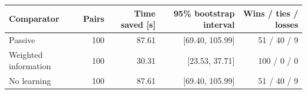 \begin{tabular}{lrrrr}
\toprule
Comparator & Pairs & Time saved [s] & 95\% bootstrap interval & Wins / ties / losses \\
\midrule
Passive & 100 & 87.61 & [69.40, 105.99] & 51 / 40 / 9 \\
Weighted information & 100 & 30.31 & [23.53, 37.71] & 100 / 0 / 0 \\
No learning & 100 & 87.61 & [69.40, 105.99] & 51 / 40 / 9 \\
\bottomrule
\end{tabular}
